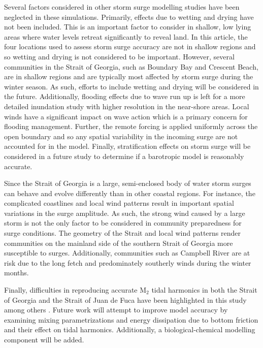 \documentclass{tATO2e}
\begin{document}
Several factors considered in other storm surge modelling studies have been neglected in these simulations. Primarily, effects due to wetting and drying have not been included. This is an important factor to consider in shallow, low lying areas where water levels retreat significantly to reveal land. In this article, the four locations used to assess storm surge accuracy are not in shallow regions and so wetting and drying is not considered to be important. However, several communities in the Strait of Georgia, such as Boundary Bay and Crescent Beach, are in shallow regions and are typically most affected by storm surge during the winter season. As such, efforts to include wetting and drying will be considered in the future. Additionally, flooding effects due to wave run up is left for a more detailed inundation study with higher resolution in the near-shore areas. Local winds have a significant impact on wave action which is a primary concern for flooding management. Further, the remote forcing is applied uniformly across the open boundary and so any spatial variability in the incoming surge are not accounted for in the model. Finally, stratification effects on storm surge will be considered in a future study to determine if a barotropic model is reasonably accurate. 

Since the Strait of Georgia is a large, semi-enclosed body of water storm surges can behave and evolve differently than in other coastal regions. For instance, the complicated coastlines and local wind patterns result in important spatial variations in the surge amplitude. As such, the strong wind caused by a large storm is not the only factor to be considered in community preparedness for surge conditions. The geometry of the Strait and local wind patterns render communities on the mainland side of the southern Strait of Georgia more susceptible to surges. Additionally, communities such as Campbell River are at risk due to the long fetch and predominately southerly winds during the winter months.

Finally, difficulties in reproducing accurate M$_2$ tidal harmonics in both the Strait of Georgia and the Strait of Juan de Fuca have been highlighted in this study among others \citep{stronach1993update, foreman2004m}. Future work will attempt to improve model accuracy by examining mixing parametrizations and energy dissipation due to bottom friction and their effect on tidal harmonics. Additionally, a biological-chemical modelling component will be added. 


\end{document}
